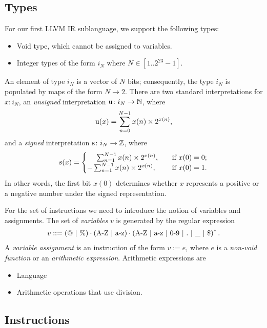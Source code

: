 \subsection{Types}
For our first LLVM IR sublanguage, we support the following types:
\begin{itemize}
\item Void type, which cannot be assigned to variables.
\item Integer types of the form $i_N$ where $N\in [1..2^{23}-1]$.
\end{itemize}
An element of type $i_N$ is a vector of $N$ bits; consequently, the type $i_N$ is populated by maps of the form $N\rightarrow 2$. There are two standard interpretations for $x\colon i_N$, an \emph{unsigned} interpretation $\text{u}\colon i_N\rightarrow \mathbb{N}$, where 
\begin{align}
\text{u}(x)= \sum_{n=0}^{N-1} x(n)\times2^{x(n)},
\end{align}
and a \emph{signed} interpretation $\text{s}\colon i_N\rightarrow \mathbb{Z}$, where
\begin{align}
\text{s}(x)= 
\begin{cases}
\ \ \ \ \sum_{n=1}^{N-1} x(n)\times2^{x(n)},\quad &\text{if $x(0)=0$};\\
-\sum_{n=1}^{N-1} x(n)\times2^{x(n)},\quad &\text{if $x(0)=1$}.
\end{cases}
\end{align}
In other words, the first bit $x(0)$ determines whether $x$ represents a positive or a negative number under the signed representation.

For the set of instructions we need to introduce the notion of variables and assignments. The set of \emph{variables} $v$ is generated by the regular expression
\begin{align}
v::= (@\ |\ \%)\cdot\left(\text{A-Z\ |\ a-z}\right)\cdot\left(\text{A-Z\ |\ a-z\ |\ 0-9\ |\ .\ |\ \_\ |\ \$}\right)^{*}.
\end{align}
A \emph{variable assignment} is an instruction of the form $v:=e$, where $e$ is a \emph{non-void function} or an \emph{arithmetic expression}. Arithmetic expressions are 
\begin{itemize}
\item Language  
\item Arithmetic operations that use division.
\end{itemize}
\subsection{Instructions} 

